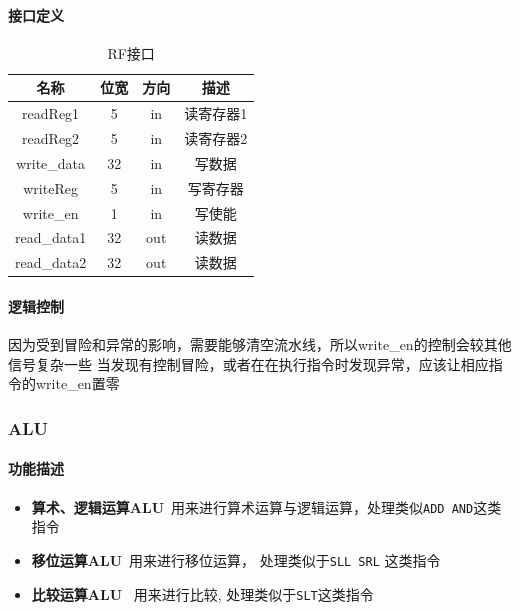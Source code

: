 \documentclass[UTF8]{ctexart}
\begin{document}
\paragraph{接口定义}
\begin{table}[h]
    \centering
    \begin{tabular}{|c|c|c|c|}
        \hline  
        名称 & 位宽 & 方向 & 描述 \\
        \hline  
        readReg1 & 5 & in &  读寄存器1 \\ \hline
        readReg2 & 5 & in & 读寄存器2 \\ \hline
        write\_data & 32 & in & 写数据 \\ \hline
        writeReg & 5 & in & 写寄存器 \\ \hline
        write\_en & 1 & in & 写使能 \\ \hline
        read\_data1 & 32 & out & 读数据 \\ \hline 
        read\_data2 & 32 & out & 读数据 \\ \hline

    \end{tabular}
    \caption{RF接口}
\end{table}
\paragraph{逻辑控制}
因为受到冒险和异常的影响，需要能够清空流水线，所以write\_en的控制会较其他信号复杂一些
当发现有控制冒险，或者在在执行指令时发现异常，应该让相应指令的write\_en置零
\subsubsection{ALU}\label{sub:alu}
\paragraph{功能描述}
\begin{itemize}
    \item \textbf{算术、逻辑运算ALU}\  用来进行算术运算与逻辑运算，处理类似\texttt{ADD AND}这类指令
    \item \textbf{移位运算ALU}\  用来进行移位运算， 处理类似于\texttt{SLL SRL} 这类指令 
    \item \textbf{比较运算ALU} \ 用来进行比较, 处理类似于\texttt{SLT}这类指令
\end{itemize}
\end{document}
